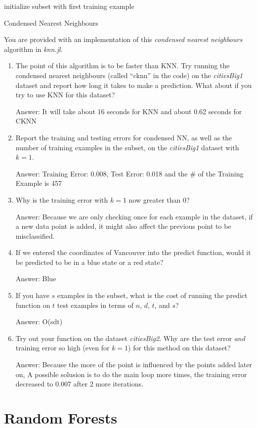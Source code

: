 \documentclass{article}
\def\ans#1{\par\gre{Answer: #1}}
\def\blu#1{{\color{blu}#1}}
\def\gre#1{{\color{gre}#1}}
\def\enum#1{\begin{enumerate}#1\end{enumerate}}
\begin{document}
\begin{algorithm}[H]
 initialize subset with first training example\;
 \caption{Condensed Nearest Neighbours}
\end{algorithm}
You are provided with an implementation of this \emph{condensed nearest neighbours} algorithm in \emph{knn.jl}. 
\blu{
\enum{
\item The point of this algorithm is to be faster than KNN. Try running the condensed nearest neighbours (called ``cknn'' in the code) on the \emph{citiesBig1} dataset and report how long it takes to make a prediction. What about if you try to use KNN for this dataset? \ans{It will take about 16 seconds for KNN and about 0.62 seconds for CKNN}
\item Report the training and testing errors for condensed NN, as well as the number of training examples in the subset, on the \emph{citiesBig1} dataset with $k=1$. \ans{Training Error: 0.008, Test Error: 0.018 and the \# of the Training Example is 457}
\item Why is the training error with $k=1$ now greater than $0$? \ans{Because we are only checking once for each example in the dataset, if a new data point is added, it might also affect the previous point to be misclassified.}
\item If we entered the coordinates of Vancouver into the predict function, would it be predicted to be in a blue state or a red state? \ans{Blue}
\item If you have $s$ examples in the subset, what is the cost of running the predict function on $t$ test examples in terms of $n$, $d$, $t$, and $s$? \ans{O(sdt)}
\item Try out your function on the dataset \emph{citiesBig2}. Why are the  test error \emph{and} training error so high (even for $k=1$) for this method on this dataset? \ans{Because the more of the point is influenced by the points added later on, A possible solusion is to do the main loop more times, the training error decreased to 0.007 after 2 more iterations. }
}
}


\section{Random Forests}
\end{document}

